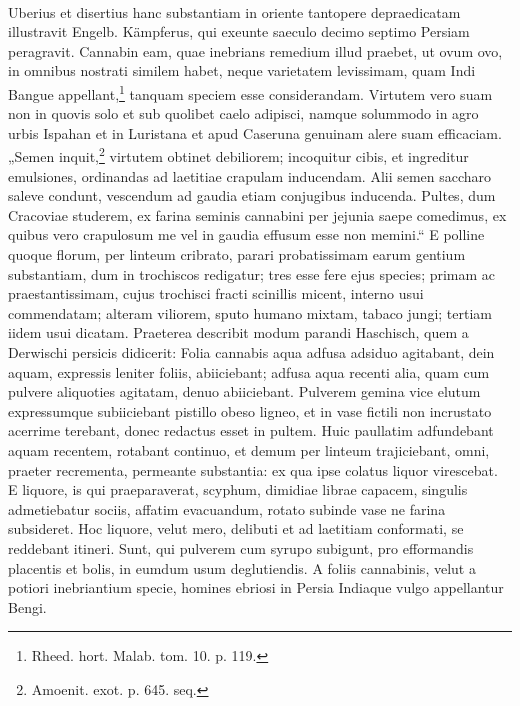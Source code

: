 \documentclass[a4paper, 11pt, oneside, polutonikogreek, german]{article}
\begin{document}
\paragraph{}
Uberius et disertius hanc substantiam in oriente tantopere depraedicatam illustravit Engelb. Kämpferus, qui exeunte saeculo decimo septimo Persiam peragravit. Cannabin eam, quae inebrians remedium illud praebet, ut ovum ovo, in omnibus nostrati similem habet, neque varietatem levissimam, quam Indi Bangue appellant,\footnote{Rheed. hort. Malab. tom. 10. p. 119.} tanquam speciem esse considerandam. Virtutem vero suam non in quovis solo et sub quolibet caelo adipisci, namque solummodo in agro urbis Ispahan et in Luristana et apud Caseruna genuinam alere suam efficaciam. „Semen inquit,\footnote{Amoenit. exot. p. 645. seq.} virtutem obtinet debiliorem; incoquitur cibis, et ingreditur emulsiones, ordinandas ad laetitiae crapulam inducendam. Alii semen saccharo saleve condunt, vescendum ad gaudia etiam conjugibus inducenda. Pultes, dum Cracoviae studerem, ex farina seminis cannabini per jejunia saepe comedimus, ex quibus vero crapulosum me vel in gaudia effusum esse non memini.“ E polline quoque florum, per linteum cribrato, parari probatissimam earum gentium substantiam, dum in trochiscos redigatur; tres esse fere ejus species; primam ac praestantissimam, cujus trochisci fracti scinillis micent, interno usui commendatam; alteram viliorem, sputo humano mixtam, tabaco jungi; tertiam iidem usui dicatam. Praeterea describit modum parandi Haschisch, quem a Derwischi persicis didicerit: Folia cannabis aqua adfusa adsiduo agitabant, dein aquam, expressis leniter foliis, abiiciebant; adfusa aqua recenti alia, quam cum pulvere aliquoties agitatam, denuo abiiciebant. Pulverem gemina vice elutum expressumque subiiciebant pistillo obeso ligneo, et in vase fictili non incrustato acerrime terebant, donec redactus esset in pultem. Huic paullatim adfundebant aquam recentem, rotabant continuo, et demum per linteum trajiciebant, omni, praeter recrementa, permeante substantia: ex qua ipse colatus liquor virescebat. E liquore, is qui praeparaverat, scyphum, dimidiae librae capacem, singulis admetiebatur sociis, affatim evacuandum, rotato subinde vase ne farina subsideret. Hoc liquore, velut mero, delibuti et ad laetitiam conformati, se reddebant itineri. Sunt, qui pulverem cum syrupo subigunt, pro efformandis placentis et bolis, in eumdum usum deglutiendis. A foliis cannabinis, velut a potiori inebriantium specie, homines ebriosi in Persia Indiaque vulgo appellantur Bengi.
\end{document}
